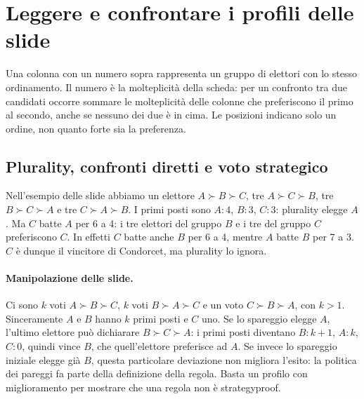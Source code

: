 \section{Leggere e confrontare i profili delle slide}
Una colonna con un numero sopra rappresenta un gruppo di elettori con lo stesso ordinamento. Il numero è la molteplicità della scheda: per un confronto tra due candidati occorre sommare le molteplicità delle colonne che preferiscono il primo al secondo, anche se nessuno dei due è in cima. Le posizioni indicano solo un ordine, non quanto forte sia la preferenza.

\subsection{Plurality, confronti diretti e voto strategico}
Nell'esempio delle slide abbiamo un elettore $A\succ B\succ C$, tre $A\succ C\succ B$, tre $B\succ C\succ A$ e tre $C\succ A\succ B$. I primi posti sono $A:4$, $B:3$, $C:3$: plurality elegge $A$. Ma $C$ batte $A$ per 6 a 4: i tre elettori del gruppo $B$ e i tre del gruppo $C$ preferiscono $C$. In effetti $C$ batte anche $B$ per 6 a 4, mentre $A$ batte $B$ per 7 a 3. $C$ è dunque il vincitore di Condorcet, ma plurality lo ignora.

\paragraph{Manipolazione delle slide.} Ci sono $k$ voti $A\succ B\succ C$, $k$ voti $B\succ A\succ C$ e un voto $C\succ B\succ A$, con $k>1$. Sinceramente $A$ e $B$ hanno $k$ primi posti e $C$ uno. Se lo spareggio elegge $A$, l'ultimo elettore può dichiarare $B\succ C\succ A$: i primi posti diventano $B:k+1$, $A:k$, $C:0$, quindi vince $B$, che quell'elettore preferisce ad $A$. Se invece lo spareggio iniziale elegge già $B$, questa particolare deviazione non migliora l'esito: la politica dei pareggi fa parte della definizione della regola. Basta un profilo con miglioramento per mostrare che una regola non è strategyproof.

